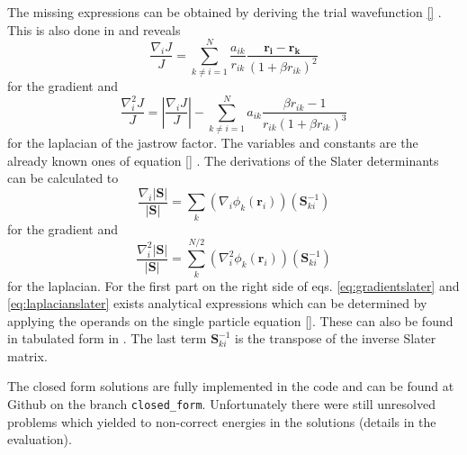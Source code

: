 The missing expressions can be obtained by deriving the trial wavefunction \ref{} . This is also done in \citet{hogberget2013} and reveals 
\begin{equation}\label{eq:jastrow-derivations}
    \frac{\nabla_i J}{J} = \sum_{k\neq i = 1}^{N}\frac{a_{ik}}{r_{ik}} \frac{\mathbf{r_i}-\mathbf{r_k}}{\left(1 + \beta r_{ik} \right)^2}
\end{equation}
for the gradient and 
\begin{equation}
    \frac{\nabla_i^2 J}{J} = \left| \frac{\nabla_i J}{J} \right| - \sum_{k\neq i = 1}^{N}a_{ik} \frac{\beta r_{ik} - 1}{r_{ik}\left(1 +\beta r_{ik} \right)^3} 
\end{equation}
for the laplacian of the jastrow factor. The variables and constants are the already known ones of equation \ref{} . The derivations of the Slater determinants can be calculated to
\begin{equation}\label{eq:gradientslater}
    \frac{\nabla_i |\mathbf{S}|}{|\mathbf{S}|} = \sum_k \left( \nabla_i \phi_k(\mathbf{r}_i)\right)(\mathbf{S}_{ki}^{-1})
\end{equation}
for the gradient and
\begin{equation}\label{eq:laplacianslater}
    \frac{\nabla_i^2 |\mathbf{S}|}{|\mathbf{S}|} = \sum_k^{N/2} \left( \nabla_i^2 \phi_k(\mathbf{r}_i)\right)(\mathbf{S}_{ki}^{-1})
\end{equation}
for the laplacian. For the first part on the right side of eqs. \ref{eq:gradientslater} and \ref{eq:laplacianslater} exists analytical expressions which can be determined by applying the operands on the single particle equation \ref{}. These can also be found in tabulated form in \citet[app. D]{hogberget2013}. The last term $\mathbf{S}_{ki}^{-1}$ is the transpose of the inverse Slater matrix. 

The closed form solutions are fully implemented in the code and can be found at Github on the branch \texttt{closed\_form}. Unfortunately there were still unresolved problems which yielded to non-correct energies in the solutions (details in the evaluation). 
